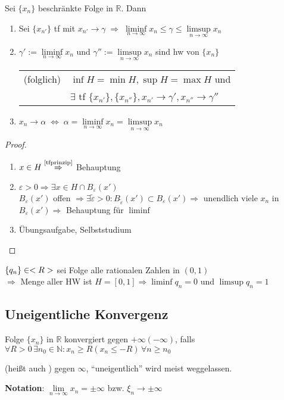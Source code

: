 \begin{proposition}
	Sei $\{x_n\}$ beschränkte Folge in $\mathbb{R}$. Dann
	\begin{enumerate}[label={\arabic*)}]
		\item Sei $\{x_{n'}\}$ \gls{tf} mit $x_{n'}\rightarrow\gamma \;\Rightarrow \;\liminf\limits_{n\rightarrow\infty} x_n \le \gamma \le \limsup\limits_{n\rightarrow\infty} x_n$
		\item $\gamma' :=\liminf\limits_{n\rightarrow\infty} x_n$ und $\gamma'' := \limsup\limits_{n\rightarrow\infty} x_n$ sind \gls{hw} von $\{x_n\}$
		
		\begin{tabular}{ll}
		(folglich)& $\inf H = \min H, \sup H = \max H$ und \\
		& $\exists$ \gls{tf} $\{x_{n'}\}, \{x_{n''}\}, x_{n'}\rightarrow \gamma', x_{n''}\rightarrow\gamma''$
		\end{tabular}
		\item $x_n\rightarrow \alpha \;\Leftrightarrow \;\alpha = \liminf\limits_{n\rightarrow\infty} x_n = \limsup\limits_{n\rightarrow\infty} x_n$
	\end{enumerate}
\end{proposition}
\begin{proof}
	\begin{enumerate}
		\item $x\in H\overset{\text{\ref{tfprinzip}}}{\Rightarrow}$ Behauptung
		\item $\varepsilon>0\Rightarrow\exists x\in H\cap B_{\varepsilon}(x')$ \\
		$B_{\varepsilon}(x')$ offen $\Rightarrow\exists\tilde{\varepsilon}>0:B_{\tilde{\varepsilon}}(x')\subset B_{\varepsilon}(x')\Rightarrow$ unendlich viele $x_n$ in $B_{\varepsilon}(x')\Rightarrow$ Behauptung für $\liminf$
		\item Übungsaufgabe, Selbststudium
	\end{enumerate}
\end{proof}

\begin{example}
	$\{q_n\}\in<R>$ sei Folge alle rationalen Zahlen in $(0,1)$ \\
	$\Rightarrow$ Menge aller HW ist $H=[0,1]\Rightarrow \liminf q_n=0$ und $\limsup q_n=1$
\end{example}

\subsection{Uneigentliche Konvergenz}
\begin{*definition}
	Folge $\{x_n\}$ in $\mathbb{R}$ konvergiert  gegen $+\infty (-\infty)$, falls $\forall R>0\,\exists n_0\in\mathbb{N}: x_n \ge R (x_n \le -R)\,\forall n\ge n_0$
	
	(heißt auch ) gegen $\infty$, "`uneigentlich"' wird meist weggelassen.
	
	\textbf{Notation}: $\lim\limits_{n\rightarrow\infty} x_n = \pm \infty$ bzw. $\xi_n\rightarrow \pm \infty$
\end{*definition}

